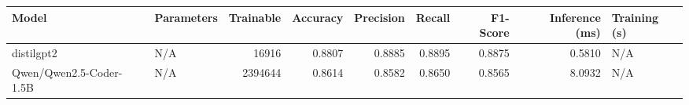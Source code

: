 \begin{tabular}{llrrrrrrl}
\toprule
Model & Parameters & Trainable & Accuracy & Precision & Recall & F1-Score & Inference (ms) & Training (s) \\
\midrule
distilgpt2 & N/A & 16916 & 0.8807 & 0.8885 & 0.8895 & 0.8875 & 0.5810 & N/A \\
Qwen/Qwen2.5-Coder-1.5B & N/A & 2394644 & 0.8614 & 0.8582 & 0.8650 & 0.8565 & 8.0932 & N/A \\
\bottomrule
\end{tabular}
